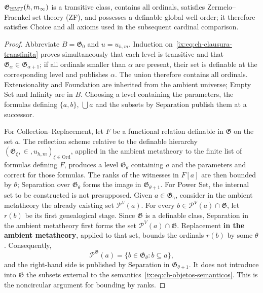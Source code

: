\begin{lemma}
\label{ix:thm:ch-6b}
\(\mathfrak G_{\rm HMT}(h,m_\infty)\) is a transitive class, contains all
ordinals, satisfies Zermelo--Fraenkel set theory (ZF), and possesses a
definable global well-order; it therefore satisfies Choice and all axioms used
in the subsequent cardinal comparison.

\end{lemma}
\begin{proof}
Abbreviate \(B=\mathfrak G_0\) and \(u=u_{h,m}\). Induction
on~\eqref{ix:eq:ch-clausura-transfinita} proves simultaneously that each level is transitive and that
\(\mathfrak G_\alpha\in\mathfrak G_{\alpha+1}\); if all ordinals
smaller than \(\alpha\) are present, their set is definable at the corresponding
level and publishes \(\alpha\). The union therefore contains all
ordinals. Extensionality and Foundation are inherited from the ambient universe;
Empty Set and Infinity are in \(B\). Choosing a level containing the parameters,
the formulas defining \(\{a,b\}\), \(\bigcup a\) and the subsets by
Separation publish them at a successor.

For Collection--Replacement, let \(F\) be a functional relation definable in
\(\mathfrak G\) on the set \(a\). The reflection scheme relative to the
definable hierarchy
\((\mathfrak G_\xi,\in,u_{h,m})_{\xi\in\mathrm{Ord}}\), applied in the ambient
metatheory to the finite list of formulas defining \(F\), produces a level
\(\mathfrak G_\theta\) containing \(a\) and the parameters and correct for
those formulas. The ranks of the witnesses in \(F[a]\) are then bounded by
\(\theta\); Separation over \(\mathfrak G_\theta\) forms the image in
\(\mathfrak G_{\theta+1}\). For Power Set, the internal set to be constructed
is not presupposed. Given \(a\in\mathfrak G_\gamma\), consider in the ambient
metatheory the already existing set \(\mathcal P^V(a)\). For every
\(b\in\mathcal P^V(a)\cap\mathfrak G\), let \(r(b)\) be its first
genealogical stage. Since \(\mathfrak G\) is a definable class, Separation in
the ambient metatheory first forms the set
\(\mathcal P^V(a)\cap\mathfrak G\). Replacement \textbf{in the ambient
metatheory}, applied to that set, bounds the ordinals \(r(b)\) by some
\(\theta\). Consequently,
\[
 \mathcal P^{\mathfrak G}(a)
 =\{b\in\mathfrak G_\theta:b\subseteq a\},
\]
and the right-hand side is published by Separation in
\(\mathfrak G_{\theta+1}\). It does not introduce into \(\mathfrak G\) the subsets
external to the semantics~\eqref{ix:eq:ch-objetos-semanticos}. This is the noncircular argument for
bounding by ranks.


\end{proof}
